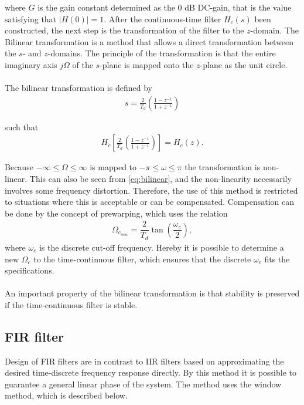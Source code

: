 where $G$ is the gain constant determined as the 0 dB DC-gain, that is the value satisfying that $|H(0)| = 1$. After the continuous-time filter $H_c(s)$ been constructed, the next step is the transformation of the filter to the $z$-domain. The Bilinear transformation is a method that allows a direct transformation between the $s$- and $z$-domains. The principle of the transformation is that the entire imaginary axis $j\Omega$ of the $s$-plane is mapped onto the $z$-plane as the unit circle.
\\\\
The bilinear transformation is defined by 
\begin{align*}
s=\frac{2}{T_d}\left(\frac{1-z^{-1}}{1+z^{-1}}\right)
\end{align*}

such that 
\begin{align} \label{eq:bilinear}
H_c\left[\frac{2}{T_d}\left(\frac{1-z^{-1}}{1+z^{-1}}\right)\right]=H_c(z). 
\end{align}

Because $-\infty \leq \Omega \leq \infty $ is mapped to $-\pi \leq \omega \leq \pi$ the transformation is non-linear. This can also be seen from \eqref{eq:bilinear}, and the non-linearity necessarily involves some frequency distortion. Therefore, the use of this method is restricted to situations where this is acceptable or can be compensated. Compensation can be done by the concept of prewarping, which uses the relation
\begin{align*}
\Omega_{c_{new}} = \dfrac{2}{T_d} \tan \left( \dfrac{\omega_c}{2} \right),
\end{align*}
where $\omega_c$ is the discrete cut-off frequency. Hereby it is possible to determine a new $\Omega_c$ to the time-continuous filter, which ensures that the discrete $\omega_c$ fits the specifications. \\\\
An important property of the bilinear transformation is that stability is preserved if the time-continuous filter is stable.

\subsection{FIR filter} \label{subsec:FIR}
Design of FIR filters are in contrast to IIR filters based on approximating the desired time-discrete frequency response directly. By this method it is possible to guarantee a general linear phase of the system. The method uses the window method, which is described below.

